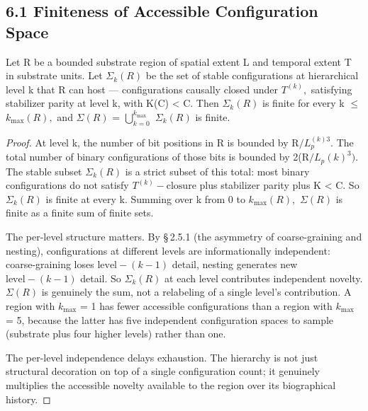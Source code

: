 \documentclass[11pt,oneside]{report}
\theoremstyle{definition}
\theoremstyle{remark}
\begin{document}
\subsection*{6.1 Finiteness of Accessible Configuration Space}

Let R be a bounded substrate region of spatial extent L and temporal
extent T in substrate units. Let \ensuremath{\Sigma_{k}(R)} be the set of stable
configurations at hierarchical level k that R can host ---
configurations causally closed under \ensuremath{T^{(k)},} satisfying stabilizer
parity at level k, with K(C) \textless{} \textbar C\textbar. Then
\ensuremath{\Sigma_{k}(R)} is finite for every k \ensuremath{\leq} \ensuremath{k_{\mathrm{max}}(R),} and \ensuremath{\Sigma (R)} =
\ensuremath{\bigcup _{k=0}^{k_{\mathrm{max}}}} \ensuremath{\Sigma_{k}(R)} is finite.

\begin{proof}
At level k, the number of bit positions in R is bounded by
\textbar R\textbar\ensuremath{/L_{p}^{(k)3}.} The total number of binary
configurations of those bits is bounded by
2(\textbar R\textbar\ensuremath{/L_{p}(k)^{3}).} The stable subset \ensuremath{\Sigma_{k}(R)} is a strict
subset of this total: most binary configurations do not satisfy
\ensuremath{T^{(k)}-\text{closure}} plus stabilizer parity plus K \textless{}
\textbar C\textbar. So \ensuremath{\Sigma_{k}(R)} is finite at every k. Summing over k from
0 to \ensuremath{k_{\mathrm{max}}(R),} \ensuremath{\Sigma (R)} is finite as a finite sum of finite sets.

The per-level structure matters. By \S\,2.5.1 (the asymmetry of
coarse-graining and nesting), configurations at different levels are
informationally independent: coarse-graining loses \ensuremath{\text{level}-(k-1)} detail,
nesting generates new \ensuremath{\text{level}-(k-1)} detail. So \ensuremath{\Sigma_{k}(R)} at each level
contributes independent novelty. \ensuremath{\Sigma (R)} is genuinely the sum, not a
relabeling of a single level's contribution. A region with \ensuremath{k_{\mathrm{max}}} = 1
has fewer accessible configurations than a region with \ensuremath{k_{\mathrm{max}}} = 5,
because the latter has five independent configuration spaces to sample
(substrate plus four higher levels) rather than one.

The per-level independence delays exhaustion. The hierarchy is not just
structural decoration on top of a single configuration count; it
genuinely multiplies the accessible novelty available to the region over
its biographical history.

\end{proof}
\end{document}
